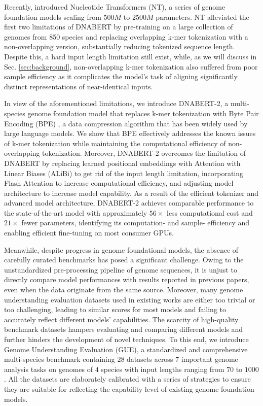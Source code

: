 \documentclass{article}
\begin{document}
Recently, \citet{nt} introduced Nucleotide Transformers (NT), a series of genome foundation models scaling from $500M$ to $2500M$ parameters. NT alleviated the first two limitations of DNABERT by pre-training on a large collection of genomes from 850 species and replacing overlapping k-mer tokenization with a non-overlapping version, substantially reducing tokenized sequence length. Despite this, a hard input length limitation still exist, while, as we will discuss in Sec. \ref{sec:background}, non-overlapping k-mer tokenization also suffered from poor sample efficiency as it complicates the model's task of aligning significantly distinct representations of near-identical inputs.

In view of the aforementioned limitations, we introduce DNABERT-2, a multi-species genome foundation model that replaces k-mer tokenization with Byte Pair Encoding (BPE) \citep{bpe}, a data compression algorithm that has been widely used by large language models. We show that BPE effectively addresses the known issues of k-mer tokenization while maintaining the computational efficiency of non-overlapping tokenization.  Moreover, DNABERT-2 overcomes the limitation of DNABERT by replacing learned positional embeddings with Attention with Linear Biases (ALiBi) \citep{alibi} to get rid of the input length limitation, incorporating Flash Attention \citep{flashattention} to increase computational efficiency, and adjusting model architecture to increase model capability. 
As a result of the efficient tokenizer and advanced model architecture, DNABERT-2 achieves comparable performance to the state-of-the-art model with approximately $56 \times$ less computational cost and $21 \times$ fewer parameters, identifying its computation- and sample- efficiency and enabling efficient fine-tuning on most consumer GPUs.

Meanwhile, despite progress in genome foundational models, the absence of carefully curated benchmarks has posed a significant challenge. Owing to the unstandardized pre-processing pipeline of genome sequences, it is unjust to directly compare model performances with results reported in previous papers, even when the data originate from the same source. 
Moreover, many genome understanding evaluation datasets used in existing works \citep{nt} are either too trivial or too challenging, leading to similar scores for most models and failing to accurately reflect different models' capabilities. 
The scarcity of high-quality benchmark datasets hampers evaluating and comparing different models and further hinders the development of novel techniques.
To this end, we introduce Genome Understanding Evaluation (GUE), a standardized and comprehensive multi-species benchmark containing $28$ datasets across $7$ important genome analysis tasks on genomes of $4$ species with input lengths ranging from $70$ to $1000$. 
All the datasets are elaborately calibrated with a series of strategies to ensure they are suitable for reflecting the capability level of existing genome foundation models. 
\end{document}

